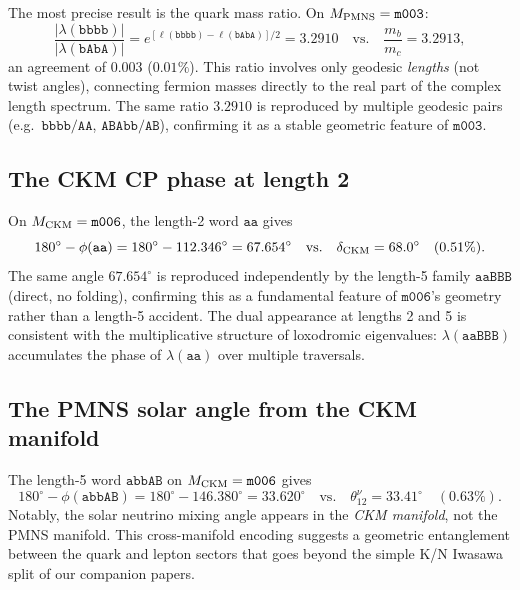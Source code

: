 \documentclass[11pt,a4paper]{article}
\newcommand{\mfld}[1]{\texttt{#1}}
\newcommand{\word}[1]{\texttt{#1}}
\newcommand{\degr}{^{\circ}}
\begin{document}
The most precise result is the quark mass ratio.
On $M_{\rm PMNS}=\mfld{m003}$:
\begin{equation}
  \frac{|\lambda(\word{bbbb})|}{|\lambda(\word{bAbA})|}
  = e^{[\ell(\word{bbbb})-\ell(\word{bAbA})]/2}
  = 3.2910 \quad\text{vs.}\quad \frac{m_b}{m_c}=3.2913,
  \label{eq:mbmc}
\end{equation}
an agreement of $0.003$ ($0.01\%$).
This ratio involves only geodesic \emph{lengths} (not twist angles),
connecting fermion masses directly to the real part of the complex length spectrum.
The same ratio $3.2910$ is reproduced by multiple geodesic pairs
(e.g.\ $\word{bbbb}/\word{AA}$, $\word{ABAbb}/\word{AB}$),
confirming it as a stable geometric feature of $\mfld{m003}$.

\subsection{The CKM CP phase at length 2}
\label{sec:delta_ckm}

On $M_{\rm CKM}=\mfld{m006}$, the length-2 word $\word{aa}$ gives
\begin{equation}
  180\degr - \phi(\word{aa}) = 180\degr - 112.346\degr = 67.654\degr
  \quad\text{vs.}\quad \delta_{\rm CKM}=68.0\degr \quad (0.51\%).
\end{equation}
The same angle $67.654\degr$ is reproduced independently by the length-5
family $\word{aaBBB}$ (direct, no folding), confirming this as a
fundamental feature of $\mfld{m006}$'s geometry rather than a length-5 accident.
The dual appearance at lengths 2 and 5 is consistent with the multiplicative
structure of loxodromic eigenvalues: $\lambda(\word{aaBBB})$ accumulates the
phase of $\lambda(\word{aa})$ over multiple traversals.

\subsection{The PMNS solar angle from the CKM manifold}
\label{sec:theta12nu}

The length-5 word $\word{abbAB}$ on $M_{\rm CKM}=\mfld{m006}$ gives
\begin{equation}
  180\degr - \phi(\word{abbAB}) = 180\degr - 146.380\degr = 33.620\degr
  \quad\text{vs.}\quad \theta_{12}^\nu=33.41\degr \quad (0.63\%).
\end{equation}
Notably, the solar neutrino mixing angle appears in the \emph{CKM manifold},
not the PMNS manifold.
This cross-manifold encoding suggests a geometric entanglement between the
quark and lepton sectors that goes beyond the simple K/N Iwasawa split
of our companion papers.
\end{document}
